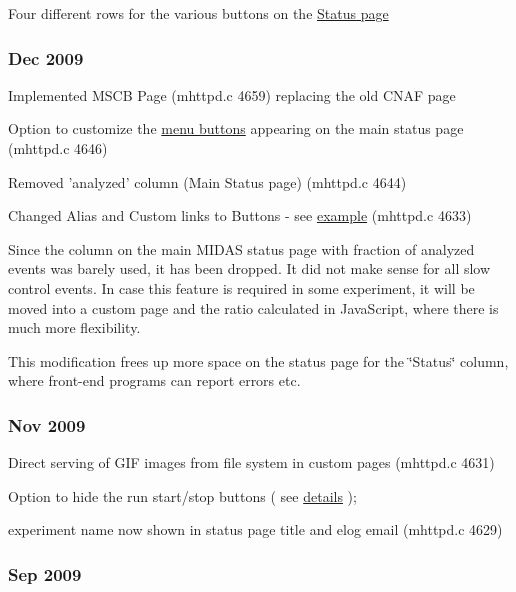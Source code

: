 \begin{DoxyItemize}
\item Four different rows for the various buttons on the \hyperlink{RC_mhttpd_status_page_redesign_alias_buttons_status_page}{Status page}
\end{DoxyItemize}\hypertarget{NDF_ndf_dec_2009}{}\subsubsection{Dec 2009}\label{NDF_ndf_dec_2009}

\begin{DoxyItemize}
\item Implemented MSCB Page (mhttpd.c 4659) replacing the old CNAF page
\item Option to customize the \hyperlink{RC_mhttpd_status_page_features_RC_mhttpd_status_menu_buttons}{menu buttons} appearing on the main status page (mhttpd.c 4646)
\item Removed 'analyzed' column (Main Status page) (mhttpd.c 4644)
\item Changed Alias and Custom links to Buttons -\/ see \hyperlink{RC_mhttpd_status_page_redesign_alias_buttons_status_page}{example} (mhttpd.c 4633)
\end{DoxyItemize}

Since the column on the main MIDAS status page with fraction of analyzed events was barely used, it has been dropped. It did not make sense for all slow control events. In case this feature is required in some experiment, it will be moved into a custom page and the ratio calculated in JavaScript, where there is much more flexibility.

This modification frees up more space on the status page for the \char`\"{}Status\char`\"{} column, where front-\/end programs can report errors etc.\hypertarget{NDF_ndf_nov_2009}{}\subsubsection{Nov 2009}\label{NDF_ndf_nov_2009}

\begin{DoxyItemize}
\item Direct serving of GIF images from file system in custom pages (mhttpd.c 4631)
\item Option to hide the run start/stop buttons ( see \hyperlink{RC_customize_ODB_RC_customize_mhttpd_run_buttons}{details} );
\item experiment name now shown in status page title and elog email (mhttpd.c 4629)
\end{DoxyItemize}\hypertarget{NDF_ndf_sep_2009}{}\subsubsection{Sep 2009}\label{NDF_ndf_sep_2009}

